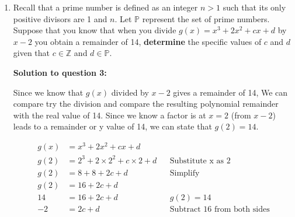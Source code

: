 \documentclass[12pt]{book}
\begin{document}
\begin{enumerate}
\begin{proof}
Case 4: If the function goes down (from positive to negative) then back up but stays negative, not touching the x-axis before going 
back down before going back up, "skimming" the x-axis on the negative side before going down negatively infinitly. This case has 4 
turning points instead of three, violating the first property
\vspace{0.5cm}

We can see that the properties of the given function do now allow 2 local minimums to exist within the single 
negative interval. Therefore there is only 1 local minimum within the only negative interval and since our point resides within this 
interval

$$\boxed{\text{and it is reasonable to assume that the point given is the local minimum.}} \qedhere$$

\end{proof}

\newpage

\item Recall that a prime number is defined as an integer $n>1$ such that its only positive divisors are 1 and $n$. Let $\mathbb{P}$ represent the set of prime numbers. Suppose that you know that when you divide $g(x) = x^3 + 2x^2 + cx + d$ by $x-2$ you obtain a remainder of 14, \textbf{determine} the specific values of $c$ and $d$ given that $c \in \mathbb{Z}$ and $d \in \mathbb{P}$. 

\vspace{0.3cm} 
\textbf{Solution to question 3:}

\vspace{0.2 cm}
 Since we know that $g(x)$ divided by $x-2$ gives a remainder of 14,
 We can compare try the division and compare the resulting polynomial remainder
with the real value of 14. Since we know a factor is at $x=2$ (from $x-2$) leads 
to a remainder or y value of 14, we can state that $g(2) = 14$.

\begin{align*}
    g(x) &= x^3 + 2x^2 + cx + d \\
    g(2) &= 2^3 + 2\times 2^2 + c\times 2 + d && \text{Substitute x as 2}\\
    g(2) &= 8 + 8 + 2c + d && \text{Simplify}\\
    g(2) &= 16 + 2c + d \\
    14 &= 16 + 2c + d && g(2) = 14\\
    -2 &= 2c + d && \text{Subtract 16 from both sides}\\
\end{align*}


\end{enumerate}
\end{document}
